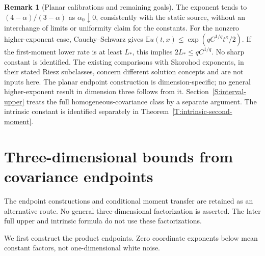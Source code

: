 \documentclass[12pt]{article}
\numberwithin{equation}{section}
\theoremstyle{definition}
\newtheorem{remark}[theorem]{Remark}
\newcommand{\E}{\mathbb{E}}
\begin{document}
\begin{remark}[Planar calibrations and remaining goals]\label{R:planar-scope}
  The exponent tends to $(4-\alpha)/(3-\alpha)$ as
  $\alpha_0\downarrow0$, consistently with the static source, without
  an interchange of limits or uniformity claim for the constants.
  For the nonzero higher-exponent case, Cauchy--Schwarz gives
  $\E u(t,x)\le\exp(qC^{1/q}t^\kappa/2)$.
  If the first-moment lower rate is at least $L_*$, this implies
  $2L_*\le qC^{1/q}$. No sharp constant is identified. The existing
  comparisons with Skorohod exponents, in their stated Riesz subclasses,
  concern different solution concepts and are not inputs here. The planar
  endpoint construction
  is dimension-specific; no general higher-exponent result in dimension
  three follows from it. Section~\ref{S:interval-upper} treats the full
  homogeneous-covariance class by a separate argument. The intrinsic
  constant is identified separately in
  Theorem~\ref{T:intrinsic-second-moment}.
\end{remark}

\section{Three-dimensional bounds from covariance endpoints}
\label{S:three-endpoints}

The endpoint constructions and conditional moment transfer are retained
as an alternative route. No general three-dimensional factorization is
asserted. The later full upper and intrinsic formula do not use these
factorizations.

We first construct the product endpoints. Zero coordinate exponents below
mean constant factors, not one-dimensional white noise.
\end{document}
